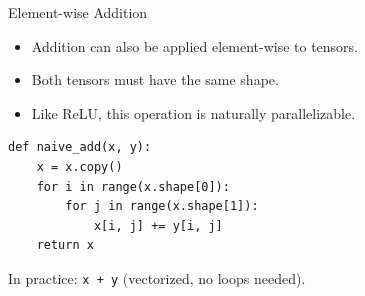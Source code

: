 \documentclass{beamer}
\begin{document}
\begin{frame}[fragile]{Element-wise Addition}
    \begin{itemize}
        \item Addition can also be applied element-wise to tensors.
        \item Both tensors must have the same shape.
        \item Like ReLU, this operation is naturally parallelizable.
    \end{itemize}

    \begin{center}
        \begin{tcolorbox}[
                width=0.75\textwidth,
                colback=gray!5,
                colframe=gray!60,
                boxrule=0.4pt,
                arc=3pt,
                left=6pt,right=6pt,top=6pt,bottom=6pt
            ]
            \begin{verbatim}
def naive_add(x, y):
    x = x.copy()
    for i in range(x.shape[0]):
        for j in range(x.shape[1]):
            x[i, j] += y[i, j]
    return x
\end{verbatim}
        \end{tcolorbox}
    \end{center}

    \vspace{0.5em}
    \small In practice: \texttt{x + y} (vectorized, no loops needed).
\end{frame}
\end{document}
